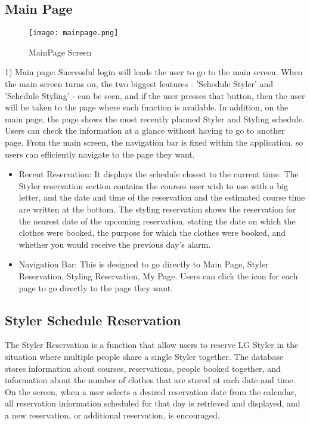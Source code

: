 \documentclass[conference]{IEEEtran}
\begin{document}
\subsection{Main Page}
\begin{figure}[htbp]
\centerline{\texttt{[image: mainpage.png]}}
\caption{MainPage Screen}
\label{fig}
\end{figure}
1) Main page: Successful login will leads the user to go to the main screen. When the main screen turns on, the two biggest features - 'Schedule Styler' and 'Schedule Styling' - can be seen, and if the user presses that button, then the user will be taken to the page where each function is available.
In addition, on the main page, the page shows the most recently planned Styler and Styling schedule. Users can check the information at a glance without having to go to another page.
From the main screen, the navigation bar is fixed within the application, so users can efficiently navigate to the page they want.
\begin{itemize}
    \item Recent Reservation: It displays the schedule closest to the current time. The Styler reservation section contains the courses user wish to use with a big letter, and the date and time of the reservation and the estimated course time are written at the bottom. The styling reservation shows the reservation for the nearest date of the upcoming reservation, stating the date on which the clothes were booked, the purpose for which the clothes were booked, and whether you would receive the previous day's alarm.
    \item Navigation Bar: This is designed to go directly to Main Page, Styler Reservation, Styling Reservation, My Page. Users can click the icon for each page to go directly to the page they want.\\
\end{itemize}

\subsection{Styler Schedule Reservation}
The Styler Reservation is a function that allow users to reserve LG Styler in the situation where multiple people share a single Styler together. The database stores information about courses, reservations, people booked together, and information about the number of clothes that are stored at each date and time. On the screen, when a user selects a desired reservation date from the calendar, all reservation information scheduled for that day is retrieved and displayed, and a new reservation, or additional reservation, is encouraged.\\
\end{document}
